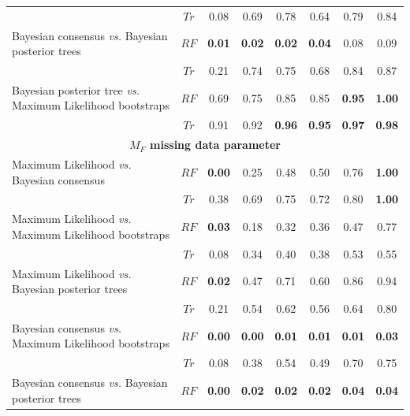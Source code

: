 \begin{landscape}
\begin{table}[!htb]
\begin{tabular}{lccccccc}
                                                                       & $Tr$ & 0.08 & 0.69 & 0.78 & 0.64 & 0.79 & 0.84 \\ 
    Bayesian consensus \textit{vs.} Bayesian posterior trees           & $RF$ & \textbf{0.01} & \textbf{0.02} & \textbf{0.02} & \textbf{0.04} & 0.08 & 0.09 \\ 
                                                                       & $Tr$ & 0.21 & 0.74 & 0.75 & 0.68 & 0.84 & 0.87 \\ 
    Bayesian posterior tree \textit{vs.} Maximum Likelihood bootstraps & $RF$ & 0.69 & 0.75 & 0.85 & 0.85 & \textbf{0.95} & \textbf{1.00} \\ 
                                                                       & $Tr$ & 0.91 & 0.92 & \textbf{0.96} & \textbf{0.95} & \textbf{0.97} & \textbf{0.98} \\ 
  \hline
  \multicolumn{8}{c}{\textbf{$M_{F}$ missing data parameter}}\\
  \hline
    Maximum Likelihood \textit{vs.} Bayesian consensus                 & $RF$ & \textbf{0.00} & 0.25 & 0.48 & 0.50 & 0.76 & \textbf{1.00} \\ 
                                                                       & $Tr$ & 0.38 & 0.69 & 0.75 & 0.72 & 0.80 & \textbf{1.00} \\ 
    Maximum Likelihood \textit{vs.} Maximum Likelihood bootstraps      & $RF$ & \textbf{0.03} & 0.18 & 0.32 & 0.36 & 0.47 & 0.77 \\ 
                                                                       & $Tr$ & 0.08 & 0.34 & 0.40 & 0.38 & 0.53 & 0.55 \\ 
    Maximum Likelihood \textit{vs.} Bayesian posterior trees           & $RF$ & \textbf{0.02} & 0.47 & 0.71 & 0.60 & 0.86 & 0.94 \\ 
                                                                       & $Tr$ & 0.21 & 0.54 & 0.62 & 0.56 & 0.64 & 0.80 \\ 
    Bayesian consensus \textit{vs.} Maximum Likelihood bootstraps      & $RF$ & \textbf{0.00} & \textbf{0.00} & \textbf{0.01} & \textbf{0.01} & \textbf{0.01} & \textbf{0.03} \\ 
                                                                       & $Tr$ & 0.08 & 0.38 & 0.54 & 0.49 & 0.70 & 0.75 \\ 
    Bayesian consensus \textit{vs.} Bayesian posterior trees           & $RF$ & \textbf{0.00} & \textbf{0.02} & \textbf{0.02} & \textbf{0.02} & \textbf{0.04} & \textbf{0.04} \\ 

\end{tabular}
\end{table}
\end{landscape}
